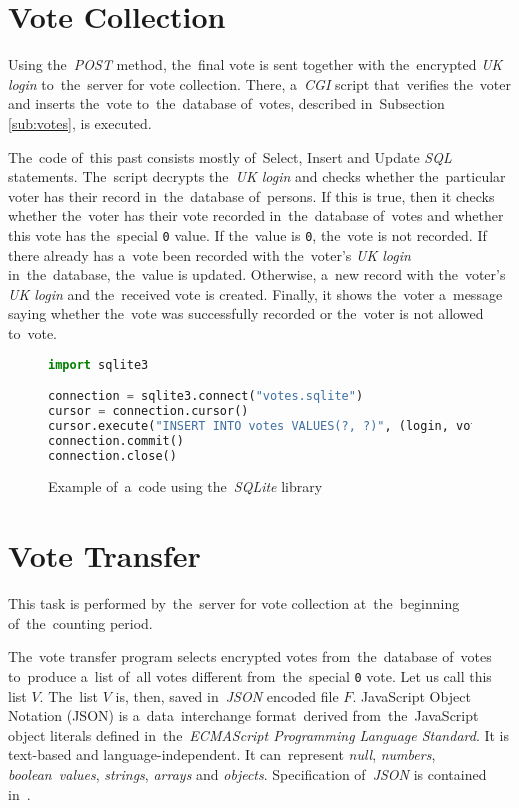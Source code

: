 \section{Vote Collection}
Using the~\emph{POST} method, the~final vote is sent together with the~encrypted \emph{UK login} to~the~server for vote collection. There, a~\emph{CGI} script that~verifies the~voter and inserts the~vote to~the~database of~votes, described in~Subsection \ref{sub:votes}, is executed. 

The~code of~this past consists mostly of~Select, Insert and Update \emph{SQL} statements. The~script decrypts the~\emph{UK login} and checks whether the~particular voter has their record in~the~database of~persons. If this is true, then it checks whether the~voter has their vote recorded in~the~database of~votes and whether this vote has the~special \texttt{0} value. If the~value is \texttt{0}, the~vote is not recorded. If there already has a~vote been recorded with the~voter's \emph{UK login} in~the~database, the~value is updated. Otherwise, a~new record with the~voter's \emph{UK login} and the~received vote is created. Finally, it shows the~voter a~message saying whether the~vote was successfully recorded or the~voter is not allowed to~vote. 

\begin{figure}[h]
\begin{lstlisting}[language=Python]
import sqlite3

connection = sqlite3.connect("votes.sqlite")
cursor = connection.cursor()
cursor.execute("INSERT INTO votes VALUES(?, ?)", (login, vote,))
connection.commit()
connection.close()
\end{lstlisting}
\caption{Example of~a~code using the~\emph{SQLite} library}
\end{figure}

\section{Vote Transfer}
This task is performed by~the~server for vote collection at~the~beginning of~the~counting period.

The~vote transfer program selects encrypted votes from~the~database of~votes to~produce a~list of~all votes different from~the~special \texttt{0} vote. Let us call this list $V$. The~list $V$ is, then, saved in~\emph{JSON} encoded file $F$. JavaScript Object Notation (JSON) is a~data~interchange format~derived from~the~JavaScript object literals defined in~the~\emph{ECMAScript Programming Language Standard}. It is text-based and language-independent. It can~represent \emph{null}, \emph{numbers}, \emph{boolean~values}, \emph{strings}, \emph{arrays} and \emph{objects}. Specification of~\emph{JSON} is contained in~\cite{JSON}. %

